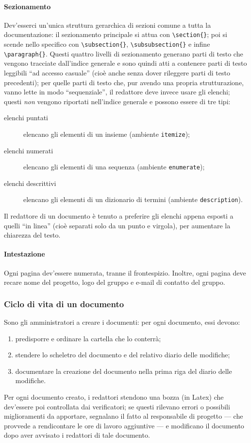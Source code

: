\paragraph{Sezionamento} Dev'esserci un'unica struttura gerarchica di sezioni comune a tutta la documentazione: il sezionamento principale si attua con \texttt{\textbackslash section\{\}}; poi si scende nello specifico con \texttt{\textbackslash subsection\{\}}, \texttt{\textbackslash subsubsection\{\}} e infine \texttt{\textbackslash paragraph\{\}}. Questi quattro livelli di sezionamento generano parti di testo che vengono tracciate dall'indice generale e sono quindi atti a contenere parti di testo leggibili “ad accesso casuale” (cioè anche senza dover rileggere parti di testo precedenti); per quelle parti di testo che, pur avendo una propria strutturazione, vanno lette in modo “sequenziale”, il redattore deve invece usare gli elenchi; questi \emph{non} vengono riportati nell'indice generale e possono essere di tre tipi:
\begin{description}
	\item[elenchi puntati] elencano gli elementi di un insieme (ambiente \texttt{itemize});
	\item[elenchi numerati] elencano gli elementi di una sequenza (ambiente \texttt{enumerate});
	\item[elenchi descrittivi] elencano gli elementi di un dizionario di termini (ambiente \texttt{description}).
\end{description}
Il redattore di un documento è tenuto a preferire gli elenchi appena esposti a quelli “in linea” (cioè separati solo da un punto e virgola), per aumentare la chiarezza del testo.
\paragraph{Intestazione} Ogni pagina dev'essere numerata, tranne il frontespizio. Inoltre, ogni pagina deve recare nome del progetto, logo del gruppo e e-mail di contatto del gruppo.

\subsubsection{Ciclo di vita di un documento} Sono gli amministratori a creare i documenti: per ogni documento, essi devono:
\begin{enumerate}
	\item predisporre e ordinare la cartella che lo conterrà;
	\item stendere lo scheletro del documento e del relativo diario delle modifiche;
	\item documentare la creazione del documento nella prima riga del diario delle modifiche.
\end{enumerate}
Per ogni documento creato, i redattori stendono una bozza (in Latex) che dev'essere poi controllata dai verificatori; se questi rilevano errori o possibili miglioramenti da apportare, segnalano il fatto al responsabile di progetto --- che provvede a rendicontare le ore di lavoro aggiuntive --- e modificano il documento dopo aver avvisato i redattori di tale documento.

